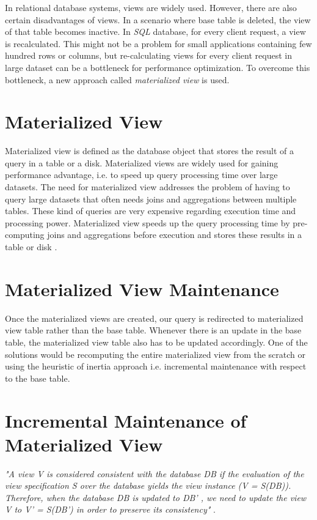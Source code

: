 \documentclass[11pt,a4paper,bibtotoc,idxtotoc,headsepline,footsepline,footexclude,BCOR12mm,DIV13]{scrbook}
\begin{document}
In relational database systems, views are widely used. However, there are also certain disadvantages of views. In a scenario where base table is deleted, the view of that table becomes inactive. In \emph{SQL} database, for every client request, a view is recalculated. This might not be a problem for small applications containing few hundred rows or columns, but re-calculating views for every client request in large dataset can be a bottleneck for performance optimization. To overcome this bottleneck, a new approach called \emph{materialized view} is used.


\section{Materialized View}

Materialized view is defined as the database object that stores the result of a query in a table or a disk. Materialized views are widely used for gaining performance advantage, i.e. to speed up query processing time over large datasets. The need for materialized view addresses the problem of having to query large datasets that often needs joins and aggregations between multiple tables. These kind of queries are very expensive regarding execution time and processing power. Materialized view speeds up the query processing time by pre-computing joins and aggregations before execution and stores these results in a table or disk \cite{incremental:materializedviews}. 

\section{Materialized View Maintenance}
Once the materialized views are created, our query is redirected to materialized view table rather than the base table. Whenever there is an update in the base table, the materialized view table also has to be updated accordingly. One of the solutions would be recomputing the entire materialized view from the scratch or using the heuristic of inertia \cite{maintenance:materializedviews} approach i.e. incremental maintenance with respect to the base table.

\section{Incremental Maintenance of Materialized View}
\emph{"A view V is considered consistent with the database DB if the evaluation of the view specification S over the database yields the view instance (V = S(DB)). Therefore, when the database DB is updated to DB' , we need to update the view V to V' = S(DB') in order to preserve its consistency"} \cite{incrementalmaintenance:materializedviews}. 
\end{document}
